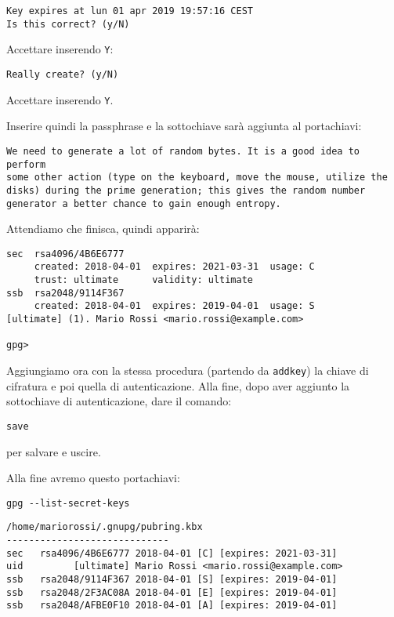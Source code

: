 \begin{lstlisting}
Key expires at lun 01 apr 2019 19:57:16 CEST
Is this correct? (y/N)
\end{lstlisting}

Accettare inserendo \texttt{Y}:

\begin{lstlisting}
Really create? (y/N)
\end{lstlisting}

Accettare inserendo \texttt{Y}.

Inserire quindi la passphrase e la sottochiave sarà aggiunta al portachiavi:

\begin{lstlisting}
We need to generate a lot of random bytes. It is a good idea to perform
some other action (type on the keyboard, move the mouse, utilize the
disks) during the prime generation; this gives the random number
generator a better chance to gain enough entropy.
\end{lstlisting}


Attendiamo che finisca, quindi apparirà:

\begin{lstlisting}
sec  rsa4096/4B6E6777
     created: 2018-04-01  expires: 2021-03-31  usage: C
     trust: ultimate      validity: ultimate
ssb  rsa2048/9114F367
     created: 2018-04-01  expires: 2019-04-01  usage: S
[ultimate] (1). Mario Rossi <mario.rossi@example.com>

gpg>
\end{lstlisting}


Aggiungiamo ora con la stessa procedura (partendo da \texttt{addkey}) la chiave
di cifratura e poi quella di autenticazione. Alla fine, dopo aver aggiunto la
sottochiave di autenticazione, dare il comando:

\begin{lstlisting}
save
\end{lstlisting}

per salvare e uscire.

Alla fine avremo questo portachiavi:

\begin{lstlisting}
gpg --list-secret-keys
\end{lstlisting}


\begin{lstlisting}
/home/mariorossi/.gnupg/pubring.kbx
-----------------------------
sec   rsa4096/4B6E6777 2018-04-01 [C] [expires: 2021-03-31]
uid         [ultimate] Mario Rossi <mario.rossi@example.com>
ssb   rsa2048/9114F367 2018-04-01 [S] [expires: 2019-04-01]
ssb   rsa2048/2F3AC08A 2018-04-01 [E] [expires: 2019-04-01]
ssb   rsa2048/AFBE0F10 2018-04-01 [A] [expires: 2019-04-01]
\end{lstlisting}

